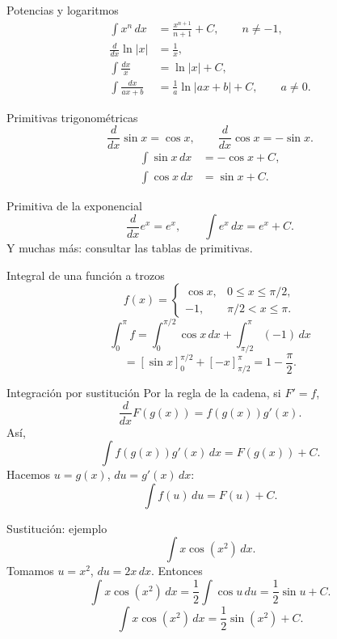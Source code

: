 \documentclass[main.tex]{subfiles}
\begin{document}
\begin{frame}{Potencias y logaritmos}
\begin{align*}\int x^n\,dx&=\frac{x^{n+1}}{n+1}+C,\qquad n\ne-1,\\\frac{d}{dx}\ln|x|&=\frac1x,\\\int\frac{dx}{x}&=\ln|x|+C,\\\int\frac{dx}{ax+b}&=\frac1a\ln|ax+b|+C,\qquad a\ne0.\end{align*}
\end{frame}

\begin{frame}{Primitivas trigonométricas}
\[\frac{d}{dx}\sin x=\cos x,\qquad\frac{d}{dx}\cos x=-\sin x.\]\begin{align*}\int\sin x\,dx&=-\cos x+C,\\\int\cos x\,dx&=\sin x+C.\end{align*}
\end{frame}

\begin{frame}{Primitiva de la exponencial}
\[\frac{d}{dx}e^x=e^x,\qquad\int e^x\,dx=e^x+C.\]\medskip Y muchas más: consultar las tablas de primitivas.
\end{frame}

\begin{frame}{Integral de una función a trozos}
\small\[f(x)=\begin{cases}\cos x,&0\le x\le\pi/2,\\-1,&\pi/2<x\le\pi.\end{cases}\]\[\int_0^\pi f=\int_0^{\pi/2}\cos x\,dx+\int_{\pi/2}^{\pi}(-1)\,dx\]\[=[\sin x]_0^{\pi/2}+[-x]_{\pi/2}^{\pi}=1-\frac\pi2.\]
\end{frame}

\begin{frame}{Integración por sustitución}
Por la regla de la cadena, si $F\prime=f$,\[\frac{d}{dx}F(g(x))=f(g(x))g\prime(x).\]Así,\[\int f(g(x))g\prime(x)\,dx=F(g(x))+C.\]Hacemos $u=g(x)$, $du=g\prime(x)\,dx$:\[\int f(u)\,du=F(u)+C.\]
\end{frame}

\begin{frame}{Sustitución: ejemplo}
\[\int x\cos(x^2)\,dx.\]Tomamos $u=x^2$, $du=2x\,dx$. Entonces\[\int x\cos(x^2)\,dx=\frac12\int\cos u\,du=\frac12\sin u+C.\]\[\boxed{\int x\cos(x^2)\,dx=\frac12\sin(x^2)+C.}\]
\end{frame}
\end{document}
